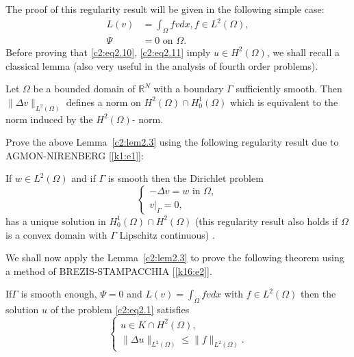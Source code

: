 The proof of this regularity result will be given in the following
simple case: 
\begin{align}
L(v) &= \int_\Omega fv dx, f \in L^2(\Omega), \tag{2.10}\label{c2:eq2.10}\\
\Psi &= 0 \text{ on } \Omega. \tag{2.11}\label{c2:eq2.11}
\end{align} 
Before proving that \eqref{c2:eq2.10}, \eqref{c2:eq2.11} imply $u
\in H^2 (\Omega)$, we 
shall recall a classical lemma (also very useful in the analysis of
fourth order problems). 
 
\begin{lemma}\label{c2:lem2.3}%
Let $\Omega$ be a bounded domain of $\mathbb{R}^N$ with a boundary
$\Gamma$ sufficiently smooth. Then $\parallel  \Delta v \parallel _{L^2 (\Omega)}$
defines a norm on $H^2(\Omega) \cap H^1_0 (\Omega)$ which is
equivalent to the norm induced by the $H^2(\Omega)$- norm. 
\end{lemma} 
  
\begin{exercise}\label{c2:exer2.1}%
Prove the above Lemma~\ref{c2:lem2.3} using the following regularity
result due to AGMON-NIRENBERG [\ref{k1:e1}]: 

If $w \in L^2 (\Omega)$ and if $\Gamma$ is smooth then the
Dirichlet problem  
$$
\begin{cases}
- \Delta v = w \text{ in } \Omega,\\
v|_\Gamma = 0,
\end{cases}
$$  
has a unique solution in $H^1_0 (\Omega) \cap H^2 (\Omega )$ (this
regularity result also holds if $\Omega$ is a convex domain with
$\Gamma$ Lipschitz continuous) . 

We shall now apply the Lemma~\ref{c2:lem2.3} to prove the following
theorem using a method of BREZIS-STAMPACCHIA [\ref{k16:e2}]. 
\end{exercise}

\begin{theorem}\label{c2:thm2.2}%
If\pageoriginale  $\Gamma $ is smooth enough, $\Psi = 0$ and $L(v) =  \int_\Omega fv
dx$ with $f \in L^2(\Omega)$ then the solution $u$ of the problem
\eqref{c2:eq2.1} satisfies 
\begin{equation}
\begin{cases}
u \in K \cap H^2 (\Omega), \\
\parallel  \Delta u \parallel  _{L^2 (\Omega)} \leq \parallel  f \parallel  _{L^2
  (\Omega)}. 
\end{cases}\tag{2.12}\label{c2:eq2.12} 
\end{equation}
\end{theorem}
 
